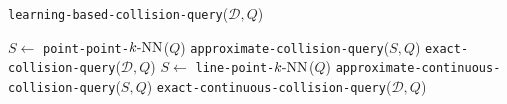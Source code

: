 \begin{algorithm}[htb]
    \caption{\texttt{learning-based-collision-query}($\mathcal D, Q$)}
    \label{algo:3:collisionquery}
    \begin{algorithmic}[1]
	   	   \STATE $S \leftarrow $ \texttt{point-point-$k\text{-NN}$}($Q$)
				\STATE \texttt{approximate-collision-query}($S, Q$)
		   \ELSE
				\STATE \texttt{exact-collision-query}($\mathcal D, Q$)
           \ENDIF
   \ENDIF
              \STATE  $S \leftarrow $ \texttt{line-point-$k\text{-NN}$}($Q$)
				   \STATE \texttt{approximate-continuous-collision-query}($S, Q$)
			  \ELSE
                    \STATE \texttt{exact-continuous-collision-query}($\mathcal D, Q$)
              \ENDIF
\ENDIF
	    \end{algorithmic}
\end{algorithm}


